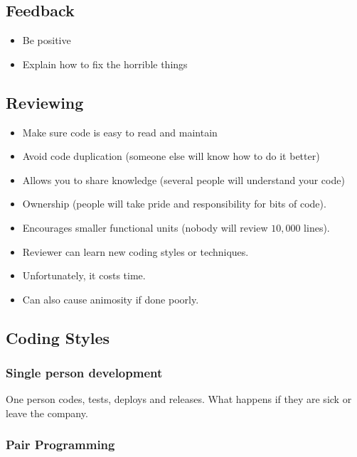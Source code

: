\subsection{Feedback}\label{sub:feedback}

\begin{itemize}
	\item Be positive
	\item Explain how to fix the horrible things
\end{itemize}

\subsection{Reviewing}\label{sub:reviewing}

\begin{itemize}
	\item Make sure code is easy to read and maintain
	\item Avoid code duplication (someone else will know how to do it better)
	\item Allows you to share knowledge (several people will understand your code)
	\item Ownership (people will take pride and responsibility for bits of code).
	\item Encourages smaller functional units (nobody will review \(10,000\) lines).
	\item Reviewer can learn new coding styles or techniques.
	\item Unfortunately, it costs time.
	\item Can also cause animosity if done poorly.
\end{itemize}

\subsection{Coding Styles}\label{sub:coding_styles}

\subsubsection{Single person development}\label{ssub:single_person_development}

One person codes, tests, deploys and releases.
What happens if they are sick or leave the company.

\subsubsection{Pair Programming}\label{ssub:pair_programming}

